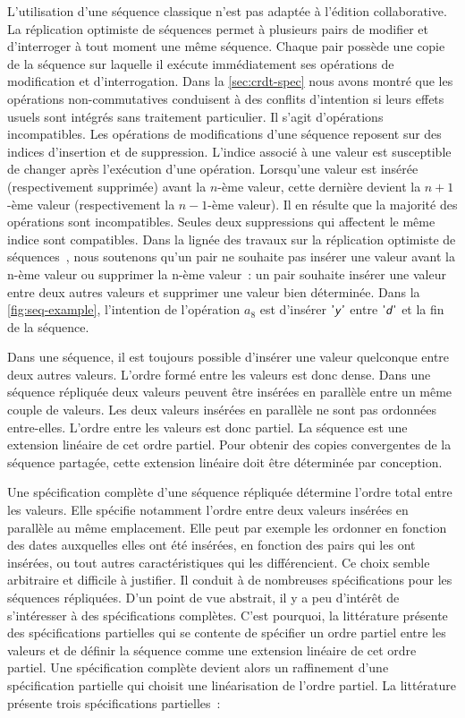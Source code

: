 L'utilisation d'une séquence classique n'est pas adaptée à l'édition collaborative.
La réplication optimiste de séquences permet à plusieurs pairs de modifier et d'interroger à tout moment une même séquence.
Chaque pair possède une copie de la séquence sur laquelle il exécute immédiatement ses opérations de modification et d'interrogation.
Dans la \autoref{sec:crdt-spec} nous avons montré que les opérations non-commutatives conduisent à des conflits d'intention si leurs effets usuels sont intégrés sans traitement particulier.
Il s'agit d'opérations incompatibles.
Les opérations de modifications d'une séquence reposent sur des indices d'insertion et de suppression.
L'indice associé à une valeur est susceptible de changer après l'exécution d'une opération.
Lorsqu'une valeur est insérée (respectivement supprimée) avant la $n$-ème valeur, cette dernière devient la $n+1$-ème valeur (respectivement la $n-1$-ème valeur).
Il en résulte que la majorité des opérations sont incompatibles.
Seules deux suppressions qui affectent le même indice sont compatibles.
Dans la lignée des travaux sur la réplication optimiste de séquences~\autocite{oster_2006_woot,sun_1998_cci}, nous soutenons qu'un pair ne souhaite pas insérer une valeur avant la n-ème valeur ou supprimer la n-ème valeur~:
un pair souhaite insérer une valeur entre deux autres valeurs et supprimer une valeur bien déterminée.
Dans la \autoref{fig:seq-example}, l'intention de l'opération $a_8$ est d'insérer $\textsf{'\textit{y}'}$ entre $\textsf{'\textit{d}'}$ et la fin de la séquence.

Dans une séquence, il est toujours possible d'insérer une valeur quelconque entre deux autres valeurs.
L'ordre formé entre les valeurs est donc dense.
Dans une séquence répliquée deux valeurs peuvent être insérées en parallèle entre un même couple de valeurs.
Les deux valeurs insérées en parallèle ne sont pas ordonnées entre-elles.
L'ordre entre les valeurs est donc partiel.
La séquence est une extension linéaire de cet ordre partiel.
Pour obtenir des copies convergentes de la séquence partagée, cette extension linéaire doit être déterminée par conception.

Une spécification complète d'une séquence répliquée détermine l'ordre total entre les valeurs.
Elle spécifie notamment l'ordre entre deux valeurs insérées en parallèle au même emplacement.
Elle peut par exemple les ordonner en fonction des dates auxquelles elles ont été insérées, en fonction des pairs qui les ont insérées, ou tout autres caractéristiques qui les différencient.
Ce choix semble arbitraire et difficile à justifier.
Il conduit à de nombreuses spécifications pour les séquences répliquées.
D'un point de vue abstrait, il y a peu d'intérêt de s'intéresser à des spécifications complètes.
C'est pourquoi, la littérature présente des spécifications partielles qui se contente de spécifier un ordre partiel entre les valeurs et de définir la séquence comme une extension linéaire de cet ordre partiel.
Une spécification complète devient alors un raffinement d'une spécification partielle qui choisit une linéarisation de l'ordre partiel.
La littérature présente trois spécifications partielles~:

